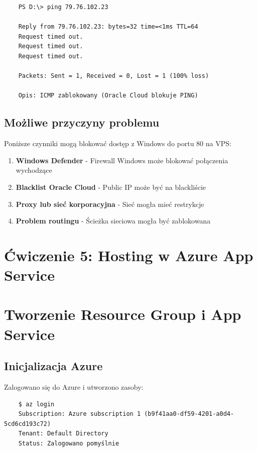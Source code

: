 \documentclass[twoside]{article}
\begin{document}
\begin{verbatim}
	PS D:\> ping 79.76.102.23
	
	Reply from 79.76.102.23: bytes=32 time=<1ms TTL=64
	Request timed out.
	Request timed out.
	Request timed out.
	
	Packets: Sent = 1, Received = 0, Lost = 1 (100% loss)
	
	Opis: ICMP zablokowany (Oracle Cloud blokuje PING)
\end{verbatim}

\subsection{Możliwe przyczyny problemu}

Poniższe czynniki mogą blokować dostęp z Windows do portu 80 na VPS:

\begin{enumerate}
	\item \textbf{Windows Defender} - Firewall Windows może blokować połączenia wychodzące
	\item \textbf{Blacklist Oracle Cloud} - Public IP może być na blackliście
	\item \textbf{Proxy lub sieć korporacyjna} - Sieć mogła mieć restrykcje
	\item \textbf{Problem routingu} - Ścieżka sieciowa mogła być zablokowana
\end{enumerate}

\section{Ćwiczenie 5: Hosting w Azure App Service}

\section{Tworzenie Resource Group i App Service}

\subsection{Inicjalizacja Azure}

Zalogowano się do Azure i utworzono zasoby:

\begin{verbatim}
	$ az login
	Subscription: Azure subscription 1 (b9f41aa0-df59-4201-a0d4-5cd6cd193c72)
	Tenant: Default Directory
	Status: Zalogowano pomyślnie
\end{verbatim}
\end{document}
